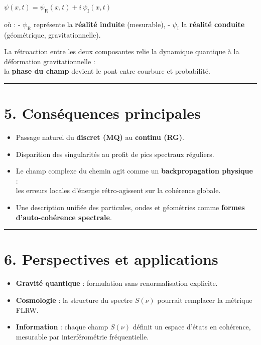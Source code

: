 \documentclass[
  11pt,
]{article}
\providecommand{\tightlist}{%
  \setlength{\itemsep}{0pt}\setlength{\parskip}{0pt}}
\begin{document}
\(\psi(x,t) = \psi_\mathrm{R}(x,t) + i\, \psi_\mathrm{I}(x,t)\)

où : - \(\psi_\mathrm{R}\) représente la \textbf{réalité induite}
(mesurable), - \(\psi_\mathrm{I}\) la \textbf{réalité conduite}
(géométrique, gravitationnelle).

La rétroaction entre les deux composantes relie la dynamique quantique à
la déformation gravitationnelle :\\
la \textbf{phase du champ} devient le pont entre courbure et
probabilité.

\begin{center}\rule{0.5\linewidth}{0.5pt}\end{center}

\hypertarget{consuxe9quences-principales}{%
\section{5. Conséquences
principales}\label{consuxe9quences-principales}}

\begin{itemize}
\tightlist
\item
  Passage naturel du \textbf{discret (MQ)} au \textbf{continu (RG)}.\\
\item
  Disparition des singularités au profit de pics spectraux réguliers.\\
\item
  Le champ complexe du chemin agit comme un \textbf{backpropagation
  physique} :\\
  les erreurs locales d'énergie rétro-agissent sur la cohérence
  globale.\\
\item
  Une description unifiée des particules, ondes et géométries comme
  \textbf{formes d'auto-cohérence spectrale}.
\end{itemize}

\begin{center}\rule{0.5\linewidth}{0.5pt}\end{center}

\hypertarget{perspectives-et-applications}{%
\section{6. Perspectives et
applications}\label{perspectives-et-applications}}

\begin{itemize}
\tightlist
\item
  \textbf{Gravité quantique} : formulation sans renormalisation
  explicite.\\
\item
  \textbf{Cosmologie} : la structure du spectre \(S(\nu)\) pourrait
  remplacer la métrique FLRW.\\
\item
  \textbf{Information} : chaque champ \(S(\nu)\) définit un espace
  d'états en cohérence, mesurable par interférométrie fréquentielle.
\end{itemize}
\end{document}
